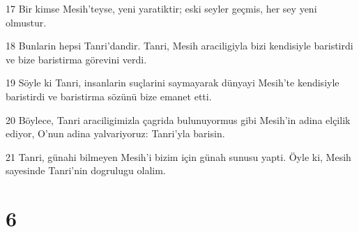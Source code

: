 \par 17 Bir kimse Mesih'teyse, yeni yaratiktir; eski seyler geçmis, her sey yeni olmustur.
\par 18 Bunlarin hepsi Tanri'dandir. Tanri, Mesih araciligiyla bizi kendisiyle baristirdi ve bize baristirma görevini verdi.
\par 19 Söyle ki Tanri, insanlarin suçlarini saymayarak dünyayi Mesih'te kendisiyle baristirdi ve baristirma sözünü bize emanet etti.
\par 20 Böylece, Tanri araciligimizla çagrida bulunuyormus gibi Mesih'in adina elçilik ediyor, O'nun adina yalvariyoruz: Tanri'yla barisin.
\par 21 Tanri, günahi bilmeyen Mesih'i bizim için günah sunusu yapti. Öyle ki, Mesih sayesinde Tanri'nin dogrulugu olalim.

\chapter{6}

